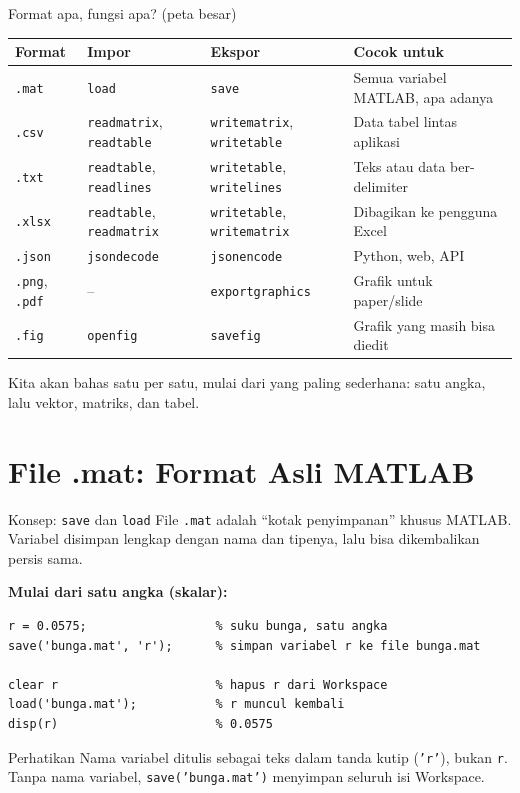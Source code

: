 \documentclass[10pt,aspectratio=169]{beamer}
\newcommand{\kode}[1]{\texttt{\small #1}}
\begin{document}
\begin{frame}{Format apa, fungsi apa? (peta besar)}
  \centering\footnotesize
  \begin{tabular}{l l l l}
    \toprule
    \textbf{Format} & \textbf{Impor} & \textbf{Ekspor} & \textbf{Cocok untuk} \\
    \midrule
    \texttt{.mat}  & \texttt{load}       & \texttt{save}         & Semua variabel MATLAB, apa adanya \\
    \texttt{.csv}  & \texttt{readmatrix}, \texttt{readtable} & \texttt{writematrix}, \texttt{writetable} & Data tabel lintas aplikasi \\
    \texttt{.txt}  & \texttt{readtable}, \texttt{readlines} & \texttt{writetable}, \texttt{writelines} & Teks atau data ber-delimiter \\
    \texttt{.xlsx} & \texttt{readtable}, \texttt{readmatrix} & \texttt{writetable}, \texttt{writematrix} & Dibagikan ke pengguna Excel \\
    \texttt{.json} & \texttt{jsondecode} & \texttt{jsonencode} & Python, web, API \\
    \texttt{.png}, \texttt{.pdf} & -- & \texttt{exportgraphics} & Grafik untuk paper/slide \\
    \texttt{.fig}  & \texttt{openfig} & \texttt{savefig} & Grafik yang masih bisa diedit \\
    \bottomrule
  \end{tabular}

  \vspace{0.8em}
  \raggedright\small
  Kita akan bahas satu per satu, \alert{mulai dari yang paling sederhana}: satu angka, lalu vektor, matriks, dan tabel.
\end{frame}

\section{File .mat: Format Asli MATLAB}

\begin{frame}[fragile]{Konsep: \kode{save} dan \kode{load}}
  File \kode{.mat} adalah ``kotak penyimpanan'' khusus MATLAB.
  Variabel disimpan \alert{lengkap dengan nama dan tipenya}, lalu bisa dikembalikan persis sama.

  \vspace{0.3em}
  \textbf{Mulai dari satu angka (skalar):}
\begin{lstlisting}
r = 0.0575;                  % suku bunga, satu angka
save('bunga.mat', 'r');      % simpan variabel r ke file bunga.mat

clear r                      % hapus r dari Workspace
load('bunga.mat');           % r muncul kembali
disp(r)                      % 0.0575
\end{lstlisting}
  \begin{alertblock}{Perhatikan}
    Nama variabel ditulis sebagai \alert{teks dalam tanda kutip} (\kode{'r'}), bukan \kode{r}.
    Tanpa nama variabel, \kode{save('bunga.mat')} menyimpan \alert{seluruh} isi Workspace.
  \end{alertblock}
\end{frame}
\end{document}

